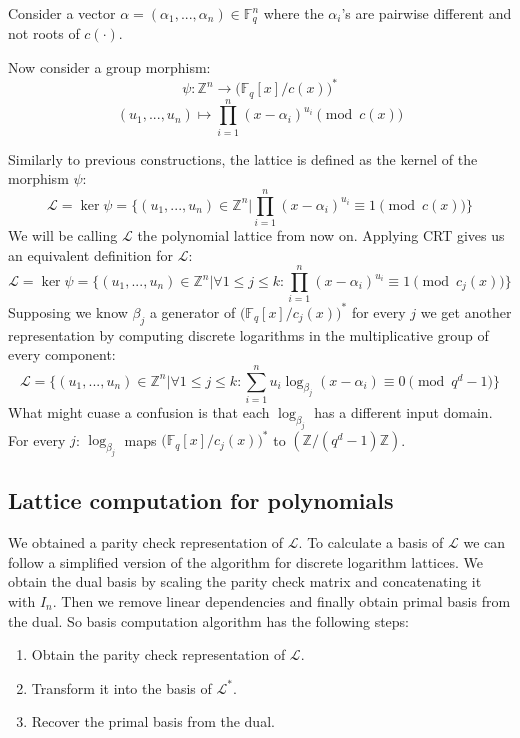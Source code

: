 \documentclass[12pt]{article}
\newcommand{\FF}{\mathbb{F}}
\newcommand{\ZZ}{\mathbb{Z}}
\newcommand{\LL}{\mathcal{L}}
\begin{document}
Consider a vector $\alpha = (\alpha_{1}, ... , \alpha_{n}) \in \FF_{q}^{n}$ where the $\alpha_{i}$'s are pairwise different and not roots of $c(\cdot)$.


Now consider a group morphism:
\[
    \psi : \ZZ^{n} \rightarrow \big(\FF_{q}[x]/c(x)\big)^{*}
\]
\[
    (u_{1}, ..., u_{n}) \mapsto \prod_{i=1}^{n}(x - \alpha_{i})^{u_{i}} \pmod{c(x)}
\]

Similarly to previous constructions, the lattice is defined as the kernel of the morphism $\psi$:
\[
    \LL = \ker \psi = \{(u_{1}, ..., u_{n}) \in \ZZ^{n} | \prod_{i=1}^{n}(x - \alpha_{i})^{u_{i}} \equiv 1 \pmod{c(x)}\}
\]
We will be calling $\LL$ the polynomial lattice from now on. Applying CRT gives us an equivalent definition for $\LL$:
\[
    \LL = \ker \psi = \{(u_{1}, ..., u_{n}) \in \ZZ^{n} |  \forall 1 \leq j \leq k: \prod_{i=1}^{n}(x - \alpha_{i})^{u_{i}} \equiv 1 \pmod{c_{j}(x)}\}
\]
Supposing we know $\beta_{j}$ a generator of $\big(\FF_{q}[x]/c_{j}(x)\big)^{*}$ for every $j$ we get another representation by computing discrete logarithms in the multiplicative group of every component:
\[
    \LL = \{(u_{1}, ..., u_{n}) \in \ZZ^{n} | \forall 1 \leq j \leq k: \sum_{i=1}^{n}u_{i}\log_{\beta_{j}}(x - \alpha_{i}) \equiv 0 \pmod{q^{d} -1}\}
\]
What might cuase a confusion is that each $\log_{\beta_{j}}$ has a different input domain. For every $j$:  $\log_{\beta_{j}}$ maps $\big(\FF_{q}[x]/c_{j}(x)\big)^{*}$ to $(\ZZ/(q^{d} - 1)\ZZ)$.


\subsection{Lattice computation for polynomials}
\label{subsec:compute_basis_polynomials}


We obtained a parity check representation of $\LL$.
To calculate a basis of $\LL$ we can follow a simplified version of the algorithm for discrete logarithm lattices. We obtain the dual basis by scaling the parity check matrix and concatenating it with $I_{n}$. Then we remove linear dependencies and finally obtain primal basis from the dual. So basis computation algorithm has the following steps:

\begin{enumerate}
    \item \label{step1_p} Obtain the parity check representation of $\LL$.
    \item \label{step2_p} Transform it into the basis of $\LL^{*}$.
    \item \label{step3_p} Recover the primal basis from the dual.
\end{enumerate}
\end{document}
